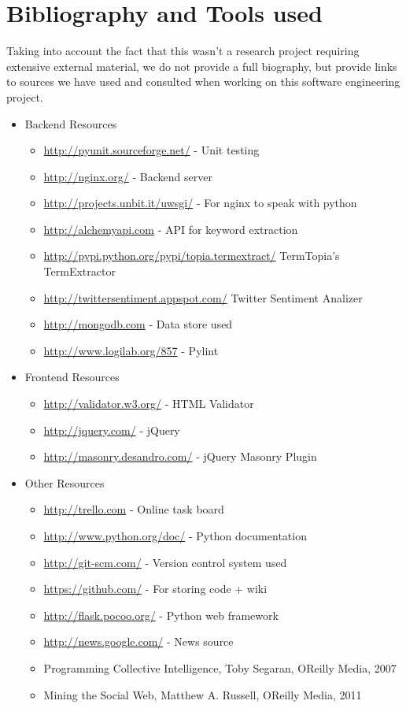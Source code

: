 \documentclass{report}
\begin{document}
	\chapter{Bibliography and Tools used}\label{chap:bib}
	
	Taking into account the fact that this wasn't a research project requiring extensive external material, we do not provide a full biography, but provide links to sources we have used and consulted when working on this software engineering project.
	
	\begin{itemize}
		\item Backend Resources
		\begin{itemize}
			\item 	\url{http://pyunit.sourceforge.net/} - Unit testing
			\item 	\url{http://nginx.org/} - Backend server
			\item 	\url{http://projects.unbit.it/uwsgi/} - For nginx to speak with python
			\item 	\url{http://alchemyapi.com} - API for keyword extraction
			\item   \url{http://pypi.python.org/pypi/topia.termextract/} TermTopia's TermExtractor
			\item   \url{http://twittersentiment.appspot.com/} Twitter Sentiment Analizer
			\item 	\url{http://mongodb.com} - Data store used 
			\item 	\url{http://www.logilab.org/857} - Pylint
		\end{itemize}
		
		
		\item Frontend Resources
		\begin{itemize}
			\item 	\url{http://validator.w3.org/} - HTML Validator
			\item 	\url{http://jquery.com/} - jQuery
			\item 	\url{http://masonry.desandro.com/} - jQuery Masonry Plugin
		\end{itemize}
		
		\item Other Resources
		\begin{itemize}
			\item 	\url{http://trello.com} - Online task board
			\item 	\url{http://www.python.org/doc/} - Python documentation
			\item 	\url{http://git-scm.com/} - Version control system used
			\item 	\url{https://github.com/} - For storing code + wiki
			\item 	\url{http://flask.pocoo.org/} - Python web framework
			\item 	\url{http://news.google.com/} - News source
			\item 	Programming Collective Intelligence, Toby Segaran, OReilly Media, 2007
			\item 	Mining the Social Web, Matthew A. Russell, OReilly Media, 2011
		\end{itemize}
		
	\end{itemize} 
	
\end{document}
